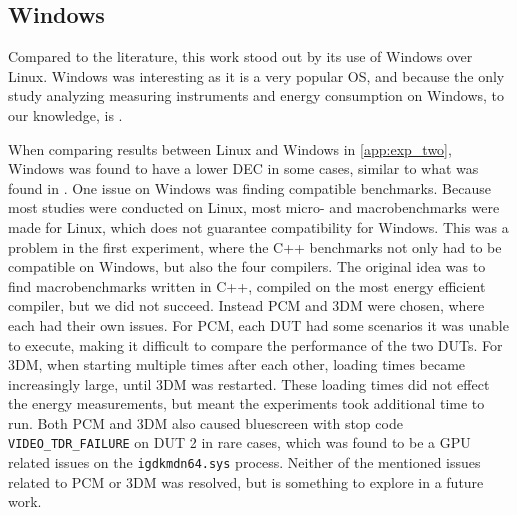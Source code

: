 \subsection{Windows}\label{subsec:windows_discussion}

Compared to the literature, this work stood out by its use of Windows over Linux\cite{khan2018rapl, georgiou2020energy, pereira2017}. Windows was interesting as it is a very popular OS, and because the only study analyzing measuring instruments and energy consumption on Windows, to our knowledge, is \cite{biksbois}.

When comparing results between Linux and Windows in \cref{app:exp_two}, Windows was found to have a lower DEC in some cases, similar to what was found in \cite{biksbois}. One issue on Windows was finding compatible benchmarks. Because most studies were conducted on Linux, most micro- and macrobenchmarks were made for Linux, which does not guarantee compatibility for Windows. This was a problem in the first experiment, where the C++ benchmarks not only had to be compatible on Windows, but also the four compilers. The original idea was to find macrobenchmarks written in C++, compiled on the most energy efficient compiler, but we did not succeed. Instead PCM and 3DM were chosen, where each had their own issues. For PCM, each DUT had some scenarios it was unable to execute, making it difficult to compare the performance of the two DUTs. For 3DM, when starting multiple times after each other, loading times became increasingly large, until 3DM was restarted. These loading times did not effect the energy measurements, but meant the experiments took additional time to run. Both PCM and 3DM also caused bluescreen with stop code \texttt{VIDEO\_TDR\_FAILURE} on DUT 2 in rare cases, which was found to be a GPU related issues on the \texttt{igdkmdn64.sys} process. Neither of the mentioned issues related to PCM or 3DM was resolved, but is something to explore in a future work.



